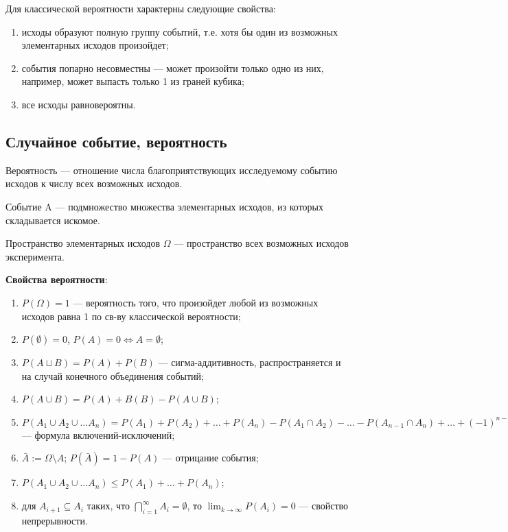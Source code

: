 
Для классической вероятности характерны следующие свойства:
\begin{enumerate}
    \item исходы образуют полную группу событий, т.е. хотя бы один из возможных элементарных исходов произойдет;
    \item события попарно несовместны --- может произойти только одно из них, например, может выпасть только 1 из граней кубика;
    \item все исходы равновероятны.
\end{enumerate}

\subsection{Случайное событие, вероятность}

\begin{definition}[Вероятность]
    Вероятность --- отношение числа благоприятствующих исследуемому событию исходов к числу всех возможных исходов.
\end{definition}

\begin{definition}[Событие]
    Событие A --- подмножество множества элементарных исходов, из которых складывается искомое.
\end{definition}

\begin{definition}
    Пространство элементарных исходов $\Omega$ --- пространство всех возможных исходов эксперимента.
\end{definition}

\textbf{Свойства вероятности}:
\begin{enumerate}
    \item $P(\Omega) = 1$ --- вероятность того, что произойдет любой из возможных исходов равна 1 по св-ву классической вероятности;
    \item $P(\emptyset) = 0$, $P(A) = 0 \Leftrightarrow  A = \emptyset$;
    \item $P(A \sqcup B) = P(A) + P(B)$ --- сигма-аддитивность, распространяется и на случай конечного объединения событий;
    \item $P(A \cup B) = P(A) + B(B) - P(A \cup B)$;
    \item $P(A_1 \cup A_2 \cup \ldots A_n) = P(A_1) + P(A_2) + \ldots + P(A_n) - P(A_1 \cap A_2) - \ldots - P(A_{n-1} \cap A_n) + \ldots + (-1)^{n-1} P(A_1 \cap \ldots \cap A_n)$ --- формула включений-исключений;
    \item $\bar{A} := \Omega \setminus A$; $P(\bar{A}) = 1 - P(A)$ --- отрицание события; 
    \item $P(A_1 \cup A_2 \cup \ldots A_n) \leq P(A_1) + \ldots + P(A_n)$;
    \item для $A_{i+1} \subseteq A_i$ таких, что $\bigcap_{i=1}^{\infty} A_i = \emptyset$, то $\lim_{k \to \infty} P(A_i) = 0$ --- свойство непрерывности. 
\end{enumerate}

